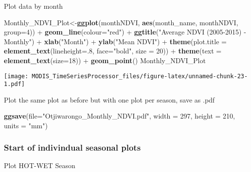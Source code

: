 \documentclass[]{article}
\newenvironment{Shaded}{\begin{snugshade}}{\end{snugshade}}
\newcommand{\KeywordTok}[1]{\textcolor[rgb]{0.13,0.29,0.53}{\textbf{{#1}}}}
\newcommand{\DataTypeTok}[1]{\textcolor[rgb]{0.13,0.29,0.53}{{#1}}}
\newcommand{\DecValTok}[1]{\textcolor[rgb]{0.00,0.00,0.81}{{#1}}}
\newcommand{\StringTok}[1]{\textcolor[rgb]{0.31,0.60,0.02}{{#1}}}
\newcommand{\NormalTok}[1]{{#1}}
\begin{document}
Plot data by month

\begin{Shaded}
\begin{Highlighting}[]
\NormalTok{Monthly_NDVI_Plot<-}\KeywordTok{ggplot}\NormalTok{(monthNDVI, }\KeywordTok{aes}\NormalTok{(month_name, monthNDVI, }\DataTypeTok{group=}\DecValTok{4}\NormalTok{)) +}
\StringTok{  }\KeywordTok{geom_line}\NormalTok{(}\DataTypeTok{colour=}\StringTok{"red"}\NormalTok{) +}
\StringTok{  }\KeywordTok{ggtitle}\NormalTok{(}\StringTok{"Average NDVI (2005-2015) - Monthly"}\NormalTok{) +}
\StringTok{  }\KeywordTok{xlab}\NormalTok{(}\StringTok{"Month"}\NormalTok{) +}\StringTok{ }\KeywordTok{ylab}\NormalTok{(}\StringTok{"Mean NDVI"}\NormalTok{) +}
\StringTok{  }\KeywordTok{theme}\NormalTok{(}\DataTypeTok{plot.title =} \KeywordTok{element_text}\NormalTok{(}\DataTypeTok{lineheight=}\NormalTok{.}\DecValTok{8}\NormalTok{, }\DataTypeTok{face=}\StringTok{"bold"}\NormalTok{,}
                                  \DataTypeTok{size =} \DecValTok{20}\NormalTok{)) +}
\StringTok{  }\KeywordTok{theme}\NormalTok{(}\DataTypeTok{text =} \KeywordTok{element_text}\NormalTok{(}\DataTypeTok{size=}\DecValTok{18}\NormalTok{)) +}\StringTok{ }\KeywordTok{geom_point}\NormalTok{()}
\NormalTok{Monthly_NDVI_Plot}
\end{Highlighting}
\end{Shaded}

\texttt{[image: MODIS\_TimeSeriesProcessor\_files/figure-latex/unnamed-chunk-23-1.pdf]}

Plot the same plot as before but with one plot per season, save as .pdf

\begin{Shaded}
\begin{Highlighting}[]
\KeywordTok{ggsave}\NormalTok{(}\DataTypeTok{file=}\StringTok{"Otjiwarongo_Monthly_NDVI.pdf"}\NormalTok{, }\DataTypeTok{width =} \DecValTok{297}\NormalTok{, }\DataTypeTok{height =} \DecValTok{210}\NormalTok{, }\DataTypeTok{units =} 
         \StringTok{"mm"}\NormalTok{)}
\end{Highlighting}
\end{Shaded}

\subsubsection{Start of indivindual seasonal
plots}\label{start-of-indivindual-seasonal-plots}

Plot HOT-WET Season
\end{document}
